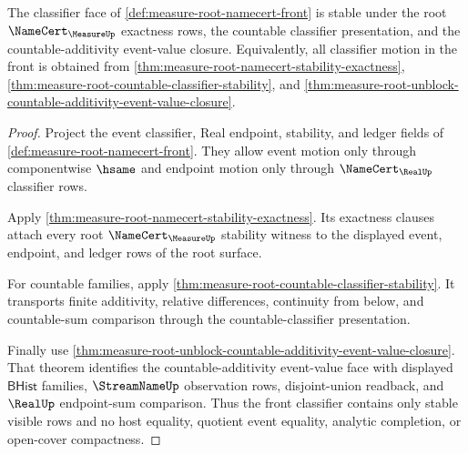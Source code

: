 \begin{theorem}
\label{thm:measure-root-namecert-front-classifier}
The classifier face of \autoref{def:measure-root-namecert-front} is stable
under the root $\NameCert_{\MeasureUp}$ exactness rows, the countable
classifier presentation, and the countable-additivity event-value closure.
Equivalently, all classifier motion in the front is obtained from
\autoref{thm:measure-root-namecert-stability-exactness},
\autoref{thm:measure-root-countable-classifier-stability}, and
\autoref{thm:measure-root-unblock-countable-additivity-event-value-closure}.
\end{theorem}
\begin{proof}
Project the event classifier, Real endpoint, stability, and ledger fields of
\autoref{def:measure-root-namecert-front}. They allow event motion only
through componentwise $\hsame$ and endpoint motion only through
$\NameCert_{\RealUp}$ classifier rows.

Apply \autoref{thm:measure-root-namecert-stability-exactness}. Its exactness
clauses attach every root $\NameCert_{\MeasureUp}$ stability witness to the
displayed event, endpoint, and ledger rows of the root surface.

For countable families, apply
\autoref{thm:measure-root-countable-classifier-stability}. It transports
finite additivity, relative differences, continuity from below, and
countable-sum comparison through the countable-classifier presentation.

Finally use
\autoref{thm:measure-root-unblock-countable-additivity-event-value-closure}.
That theorem identifies the countable-additivity event-value face with
displayed $\mathsf{BHist}$ families, $\StreamNameUp$ observation rows,
disjoint-union readback, and $\RealUp$ endpoint-sum comparison. Thus the
front classifier contains only stable visible rows and no host equality,
quotient event equality, analytic completion, or open-cover compactness.
\end{proof}

